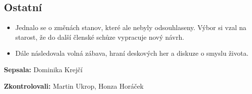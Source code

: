 \documentclass[11pt,a4paper]{article}
\begin{document}
\subsection*{Ostatní}
\begin{itemize}[itemsep=0pt]
\item Jednalo se o změnách stanov, které ale nebyly odsouhlaseny. Výbor si vzal na starost, že do další členské schůze vypracuje nový návrh.
\item Dále následovala volná zábava, hraní deskových her a diskuze o smyslu života.
\end{itemize}

\textbf{Sepsala:} Dominika Krejčí

\textbf{Zkontrolovali:} Martin Ukrop, Honza Horáček
\end{document}
